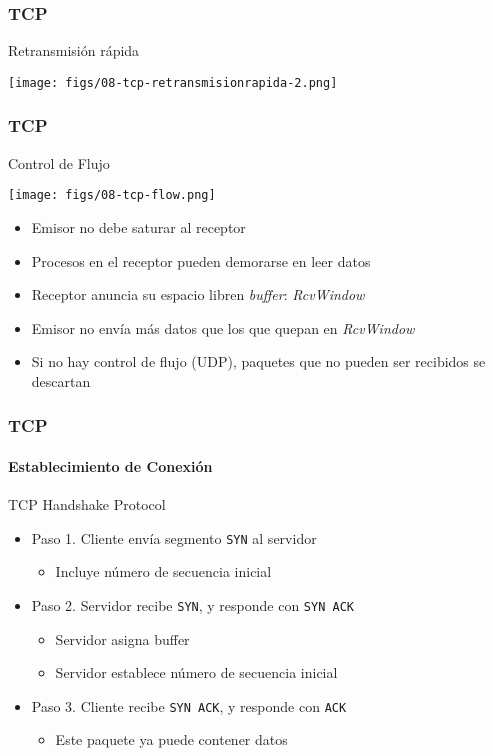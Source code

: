 \documentclass[letter]{beamer}
\begin{document}
\begin{frame}
  \frametitle{TCP}
  Retransmisión rápida

  \begin{center}
    \texttt{[image: figs/08-tcp-retransmisionrapida-2.png]}
  \end{center}


\end{frame}
\begin{frame}
  \frametitle{TCP}
  Control de Flujo
  
  \begin{center}
    \texttt{[image: figs/08-tcp-flow.png]}
  \end{center}
  
  \begin{itemize}
    \item Emisor no debe saturar al receptor
    \item Procesos en el receptor pueden demorarse en leer datos
    \item Receptor anuncia su espacio libren {\em buffer}: {\em RcvWindow}
    \item Emisor no envía más datos que los que quepan en {\em RcvWindow}
    \item Si no hay control de flujo (UDP), paquetes que no pueden ser recibidos se descartan
  \end{itemize}

\end{frame}
\begin{frame}
  \frametitle{TCP}
  \framesubtitle{Establecimiento de Conexión}
  TCP Handshake Protocol
  \begin{itemize}
    \item Paso 1. Cliente envía segmento {\tt SYN} al servidor
      \begin{itemize}
        \item Incluye número de secuencia inicial
      \end{itemize}
    \item Paso 2. Servidor recibe {\tt SYN}, y responde con {\tt SYN ACK}
      \begin{itemize}
        \item Servidor asigna buffer
        \item Servidor establece número de secuencia inicial
      \end{itemize}
    \item Paso 3. Cliente recibe {\tt SYN ACK}, y responde con {\tt ACK}
      \begin{itemize}
        \item Este paquete ya puede contener datos
      \end{itemize}
  \end{itemize}

\end{frame}
\end{document}
